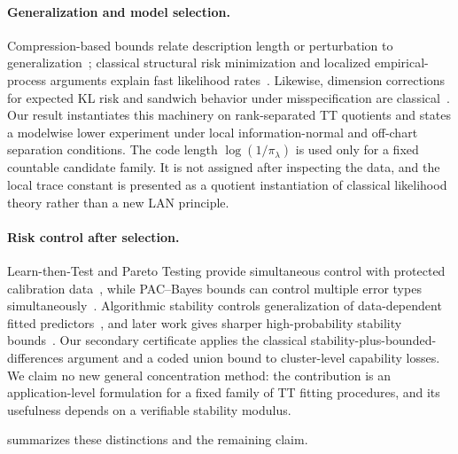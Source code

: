 \paragraph{Generalization and model selection.}
Compression-based bounds relate description length or perturbation to generalization~\citep{arora2018compression,lotfi2024compression}; classical structural risk minimization and localized empirical-process arguments explain fast likelihood rates~\citep{birge2007massart,koltchinskii2006local}. Likewise, dimension corrections for expected KL risk and sandwich behavior under misspecification are classical~\citep{akaike1973information,white1982misspecified,vandervaart1998}. Our result instantiates this machinery on rank-separated TT quotients and states a modelwise lower experiment under local information-normal and off-chart separation conditions. The code length \(\log(1/\pi_\lambda)\) is used only for a fixed countable candidate family. It is not assigned after inspecting the data, and the local trace constant is presented as a quotient instantiation of classical likelihood theory rather than a new LAN principle.

\paragraph{Risk control after selection.}
Learn-then-Test and Pareto Testing provide simultaneous control with protected calibration data~\citep{angelopoulos2021ltt,laufer2023pareto}, while PAC--Bayes bounds can control multiple error types simultaneously~\citep{adams2024multiple}. Algorithmic stability controls generalization of data-dependent fitted predictors~\citep{bousquet2002stability}, and later work gives sharper high-probability stability bounds~\citep{feldman2019stability,bousquet2020sharper}. Our secondary certificate applies the classical stability-plus-bounded-differences argument and a coded union bound to cluster-level capability losses. We claim no new general concentration method: the contribution is an application-level formulation for a fixed family of TT fitting procedures, and its usefulness depends on a verifiable stability modulus.

 summarizes these distinctions and the remaining claim.

